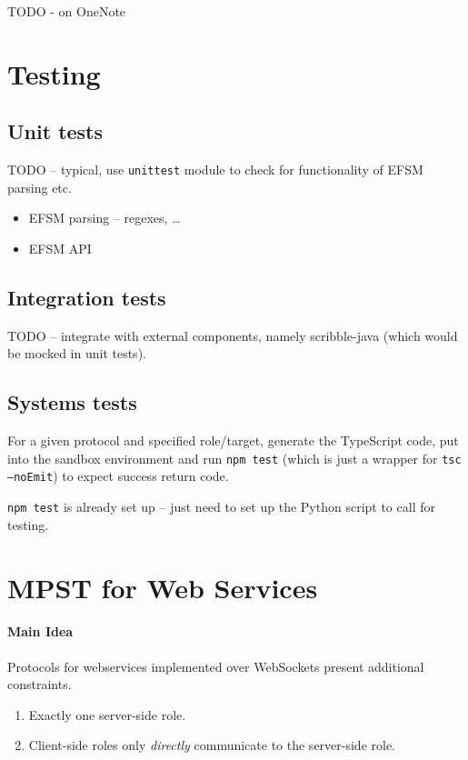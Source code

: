 \documentclass{article}
\begin{document}
TODO - on OneNote

\section{Testing}

\subsection{Unit tests}
TODO -- typical, use \texttt{unittest} module
to check for functionality of EFSM parsing
etc.

\begin{itemize}
\item EFSM parsing -- regexes, \dots
\item EFSM API
\end{itemize}

\subsection{Integration tests}
TODO -- integrate with external components, namely
scribble-java (which would be mocked in unit tests).

\subsection{Systems tests}
For a given protocol and specified role/target,
generate the TypeScript code, put into the
sandbox environment and run \texttt{npm test} 
(which is just a wrapper for 
\texttt{tsc --noEmit})
to expect success return code.

\texttt{npm test} is already set up -- just need to
set up the Python script to call for testing.

\newpage

\section{MPST for Web Services}

\paragraph{Main Idea}
Protocols for webservices implemented over WebSockets
present additional constraints.

\begin{enumerate}
\item Exactly one server-side role.
\item Client-side roles only \textit{directly} communicate 
to the server-side role.
\end{enumerate}
\end{document}
